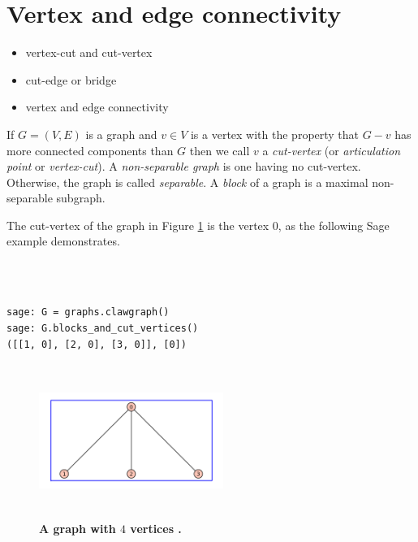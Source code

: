 
\section{Vertex and edge connectivity}

\begin{itemize}
\item vertex-cut and cut-vertex

\item cut-edge or bridge

\item vertex and edge connectivity
\end{itemize}

If $G=(V,E)$ is a graph and $v\in V$ is a vertex with the property
that $G-v$ has more connected components than $G$ then
we call $v$ a {\it cut-vertex} (or {\it articulation point} or {\it vertex-cut}).
A {\it non-separable graph} is one having no cut-vertex.
Otherwise, the graph is called {\it separable}.
A {\it block} of a graph is a maximal non-separable subgraph.

\begin{example}
{\rm
The cut-vertex of the graph in Figure \ref{fig:clawgraph}
is the vertex $0$, as the following Sage example 
demonstrates.

%
\begin{center}
\fontsize{9pt}{9pt}
\selectfont
\tt
\begin{lstlisting}

sage: G = graphs.clawgraph()
sage: G.blocks_and_cut_vertices()
([[1, 0], [2, 0], [3, 0]], [0])

\end{lstlisting}
\end{center}
%

\begin{figure}[H]
\begin{center}
\includegraphics[height=5cm,width=6cm]{image/clawgraph}
\end{center}
\caption{{\bf A graph with $4$ vertices .} }
\label{fig:clawgraph}
\end{figure}
}
\end{example}

